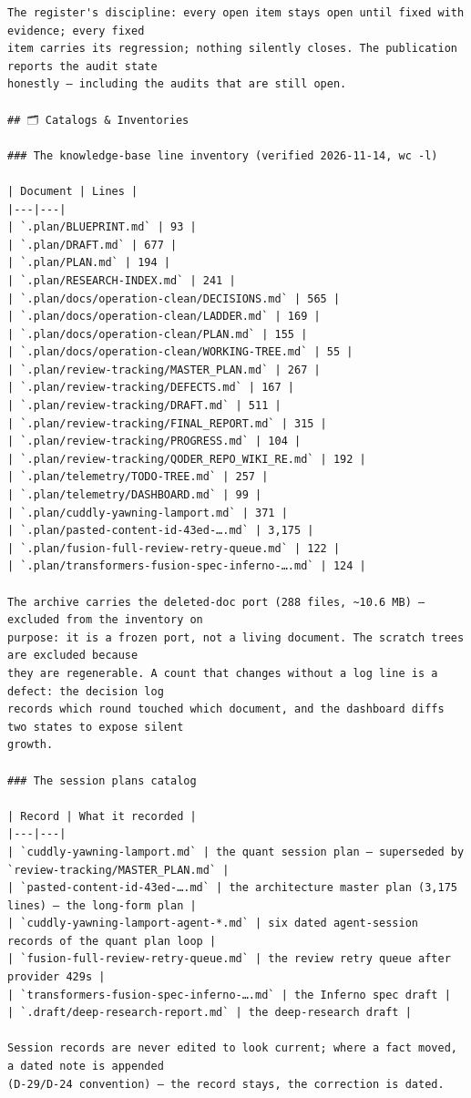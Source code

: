 \begin{Verbatim}[breaklines,breakanywhere,fontsize=\footnotesize]
The register's discipline: every open item stays open until fixed with evidence; every fixed
item carries its regression; nothing silently closes. The publication reports the audit state
honestly — including the audits that are still open.

## 🗂️ Catalogs & Inventories

### The knowledge-base line inventory (verified 2026-11-14, wc -l)

| Document | Lines |
|---|---|
| `.plan/BLUEPRINT.md` | 93 |
| `.plan/DRAFT.md` | 677 |
| `.plan/PLAN.md` | 194 |
| `.plan/RESEARCH-INDEX.md` | 241 |
| `.plan/docs/operation-clean/DECISIONS.md` | 565 |
| `.plan/docs/operation-clean/LADDER.md` | 169 |
| `.plan/docs/operation-clean/PLAN.md` | 155 |
| `.plan/docs/operation-clean/WORKING-TREE.md` | 55 |
| `.plan/review-tracking/MASTER_PLAN.md` | 267 |
| `.plan/review-tracking/DEFECTS.md` | 167 |
| `.plan/review-tracking/DRAFT.md` | 511 |
| `.plan/review-tracking/FINAL_REPORT.md` | 315 |
| `.plan/review-tracking/PROGRESS.md` | 104 |
| `.plan/review-tracking/QODER_REPO_WIKI_RE.md` | 192 |
| `.plan/telemetry/TODO-TREE.md` | 257 |
| `.plan/telemetry/DASHBOARD.md` | 99 |
| `.plan/cuddly-yawning-lamport.md` | 371 |
| `.plan/pasted-content-id-43ed-….md` | 3,175 |
| `.plan/fusion-full-review-retry-queue.md` | 122 |
| `.plan/transformers-fusion-spec-inferno-….md` | 124 |

The archive carries the deleted-doc port (288 files, ~10.6 MB) — excluded from the inventory on
purpose: it is a frozen port, not a living document. The scratch trees are excluded because
they are regenerable. A count that changes without a log line is a defect: the decision log
records which round touched which document, and the dashboard diffs two states to expose silent
growth.

### The session plans catalog

| Record | What it recorded |
|---|---|
| `cuddly-yawning-lamport.md` | the quant session plan — superseded by `review-tracking/MASTER_PLAN.md` |
| `pasted-content-id-43ed-….md` | the architecture master plan (3,175 lines) — the long-form plan |
| `cuddly-yawning-lamport-agent-*.md` | six dated agent-session records of the quant plan loop |
| `fusion-full-review-retry-queue.md` | the review retry queue after provider 429s |
| `transformers-fusion-spec-inferno-….md` | the Inferno spec draft |
| `.draft/deep-research-report.md` | the deep-research draft |

Session records are never edited to look current; where a fact moved, a dated note is appended
(D-29/D-24 convention) — the record stays, the correction is dated.


\end{Verbatim}
